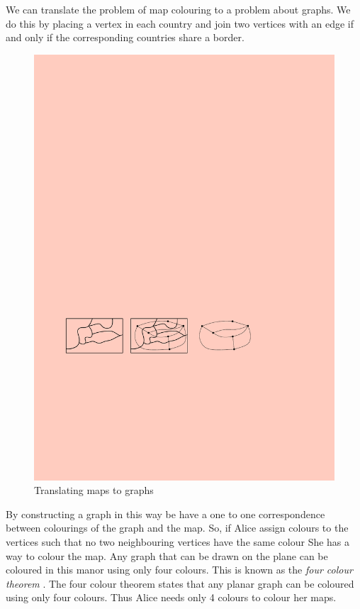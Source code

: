 We can translate the problem of map colouring to a problem about graphs. We do this by placing a vertex in each country and join two vertices with an edge if and only if the corresponding countries share a border. 
\begin{figure}[h]
    \centering
    \includegraphics[width=\textwidth]{images/161-fig38}
    \caption{Translating maps to graphs}
\end{figure}
By constructing a graph in this way be have a one to one correspondence between colourings of the graph and the map. So, if Alice assign colours to the vertices such that no two neighbouring vertices have the same colour She has a way to colour the map. Any graph that can be drawn on the plane can be coloured in this manor using only four colours. This is known as the \textit{four colour theorem} \cite{thomas19984ColourUpdate}. The four colour theorem states that any planar graph can be coloured using only four colours. Thus Alice needs only 4 colours to colour her maps.

